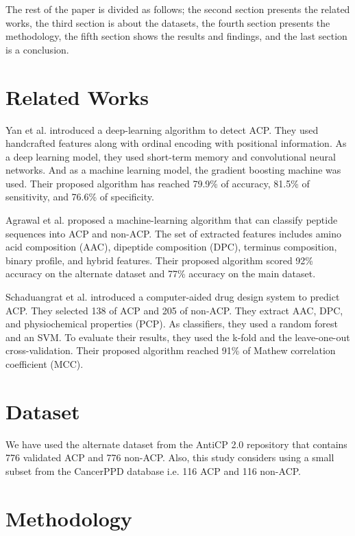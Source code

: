 \documentclass[twocolumn]{article}
\begin{document}
The rest of the paper is divided as follows; the second section presents the related works, the third section is about the datasets, the fourth section presents the methodology, the fifth section shows the results and findings, and the last section is a conclusion.


\section{Related Works}
Yan et al. \cite{yuan2023prediction} introduced a deep-learning algorithm to detect ACP. They used handcrafted features along with ordinal encoding with positional information. As a deep learning model, they used short-term memory and convolutional neural networks. And as a machine learning model, the gradient boosting machine was used. Their proposed algorithm has reached 79.9\% of accuracy, 81.5\% of sensitivity, and 76.6\% of specificity.

Agrawal et al. \cite{agrawal2021anticp} proposed a machine-learning algorithm that can classify peptide sequences into ACP and non-ACP. The set of extracted features includes amino acid composition \cite{smith1966amino} (AAC), dipeptide composition \cite{petrilli1993classification} (DPC), terminus composition, binary profile, and hybrid features. Their proposed algorithm scored 92\% accuracy on the alternate dataset and 77\% accuracy on the main dataset.

Schaduangrat et al. \cite{schaduangrat2019acpred} introduced a computer-aided drug design system to predict ACP. They selected 138 of ACP and 205 of non-ACP. They extract AAC, DPC, and physiochemical properties (PCP). As classifiers, they used a random forest \cite{qi2012random} and an SVM. To evaluate their results, they used the k-fold and the leave-one-out cross-validation. Their proposed algorithm reached 91\% of Mathew correlation coefficient (MCC).

\section{Dataset}
We have used the alternate dataset from the AntiCP 2.0 \cite{agrawal2021anticp} repository that contains 776 validated ACP and 776 non-ACP. Also, this study considers using a small subset from the CancerPPD database \cite{tyagi2015cancerppd} i.e. 116 ACP and 116 non-ACP.
\section{Methodology}
\end{document}
